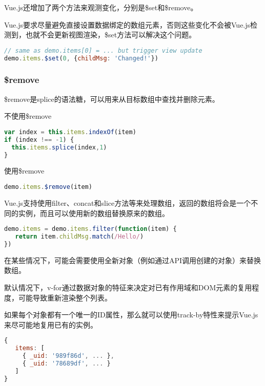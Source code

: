 Vue.js还增加了两个方法来观测变化，分别是\$set和\$remove。

Vue.js要求尽量避免直接设置数据绑定的数组元素，否则这些变化不会被Vue.js检测到，也就不会更新视图渲染，\$set方法可以解决这个问题。




\begin{lstlisting}[language=JavaScript]
// same as demo.items[0] = ... but trigger view update
demo.items.$set(0, {childMsg: 'Changed!'})
\end{lstlisting}


\subsubsection{\$remove}

\$remove是splice的语法糖，可以用来从目标数组中查找并删除元素。

\begin{compactitem}
\item 不使用\$remove

\begin{lstlisting}[language=JavaScript]
var index = this.items.indexOf(item)
if (index !== -1) {
  this.items.splice(index,1)
}
\end{lstlisting}

\item 使用\$remove

\begin{lstlisting}[language=JavaScript]
demo.items.$remove(item)
\end{lstlisting}

\end{compactitem}


Vue.js支持使用filter、concat和slice方法等来处理数组，返回的数组将会是一个不同的实例，而且可以使用新的数组替换原来的数组。


\begin{lstlisting}[language=JavaScript]
demo.items = demo.items.filter(function(item) {
   return item.childMsg.match(/Hello/)
})
\end{lstlisting}


在某些情况下，可能会需要使用全新对象（例如通过API调用创建的对象）来替换数组。

默认情况下，v-for通过数据对象的特征来决定对已有作用域和DOM元素的复用程度，可能导致重新渲染整个列表。

如果每个对象都有一个唯一的ID属性，那么就可以使用track-by特性来提示Vue.js来尽可能地复用已有的实例。

\begin{lstlisting}[language=JavaScript]
{
   items: [
     { _uid: '989f86d', ... },
     { _uid: '78689df', ... }
   ]
}
\end{lstlisting}

